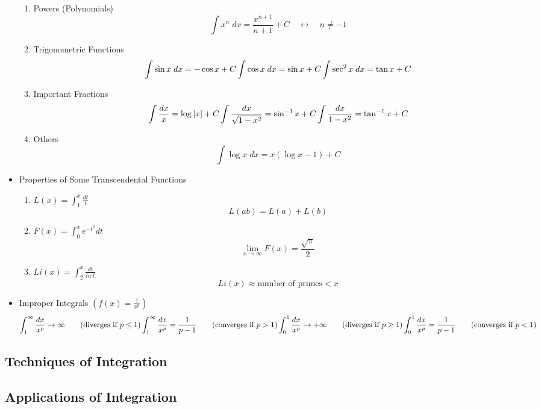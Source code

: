 \begin{itemize}
			\begin{enumerate}
				\item Powers (Polynomials)
					\begin{equation}
						\int x^n \; dx = \frac{x^{n+1}}{n+1} + C \quad \leftrightarrow \quad n \neq -1
					\end{equation}
				\item Trigonometric Functions
					\begin{equation}
						\int \sin x \; dx = - \cos x + C \\
						\int \cos x \; dx = \sin x + C \\
						\int \sec^2 x \; dx = \tan x + C
					\end{equation}
				\item Important Fractions
					\begin{equation}
						\int \frac{dx}{x} = \log |x|+ C \\
						\int \frac{dx}{\sqrt{1-x^2}} = \sin^{-1} x + C \\
						\int \frac{dx}{1-x^2}= \tan^{-1} x + C
					\end{equation}
				\item Others
					\begin{equation}
						\int \log x \; dx = x(\log x - 1) + C
					\end{equation}
			\end{enumerate}
		\item Properties of Some Transcendental Functions
			\begin{enumerate}
				\item $L(x) = \int_1^{x} \frac{dt}{t}$
					\begin{equation}
						L(ab) = L(a)+L(b)
					\end{equation}
				\item $F(x) = \int_0^x e^{-t^2}dt$
					\begin{equation}
						\lim_{x \rightarrow \infty} F(x) = \frac{\sqrt{\pi}}{2}
					\end{equation}
				\item $Li(x) = \int_2^x \frac{dt}{ln \; t}$
					\begin{equation}
						Li(x) \approx \textrm{number of primes} < x
					\end{equation}
			\end{enumerate}
		\item Improper Integrals $\left( f(x) = \frac{1}{x^p} \right)$
			\begin{equation}
				\int_1^{\infty} \frac{dx}{x^p} \rightarrow \infty \qquad \textrm{(diverges if } p \leq 1) \\
				\int_1^{\infty} \frac{dx}{x^p} = \frac{1}{p-1} \qquad \textrm{(converges if } p > 1) \\
				\int_0^1 \frac{dx}{x^p} \rightarrow + \infty \qquad \textrm{(diverges if } p \geq 1) \\
				\int_0^1 \frac{dx}{x^p} = \frac{1}{p-1} \qquad \textrm{(converges if } p < 1)
			\end{equation}
	\end{itemize}
\subsection{Techniques of Integration}
\subsection{Applications of Integration}
